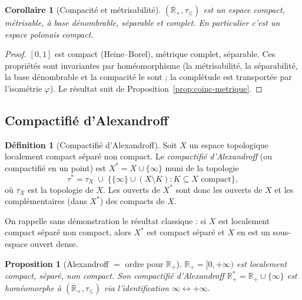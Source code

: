 \documentclass[11pt,a4paper]{article}
\theoremstyle{plain}
\newtheorem{proposition}[theorem]{Proposition}
\newtheorem{corollary}[theorem]{Corollaire}
\theoremstyle{definition}
\newtheorem{definition}[theorem]{Définition}
\newcommand{\Rp}{\mathbb{R}_+}
\newcommand{\Rpb}{\overline{\mathbb{R}}_+}
\begin{document}
\begin{corollary}[Compacité et métrisabilité]\label{cor:compact}
$(\Rpb,\tau_\le)$ est un espace \emph{compact}, \emph{métrisable}, à base
dénombrable, séparable et complet. En particulier c'est un espace
\emph{polonais compact}.
\end{corollary}

\begin{proof}
$[0,1]$ est compact (Heine--Borel), métrique complet, séparable. Ces
propriétés sont invariantes par homéomorphisme (la métrisabilité, la
séparabilité, la base dénombrable et la compacité le sont ; la complétude est
transportée par l'isométrie $\varphi$). Le résultat suit de
Proposition~\ref{prop:coinc-metrique}.
\end{proof}

\subsection{Compactifié d'Alexandroff}

\begin{definition}[Compactifié d'Alexandroff]\label{def:alex}
Soit $X$ un espace topologique localement compact séparé non compact. Le
\emph{compactifié d'Alexandroff} (ou compactifié en un point) est
$X^*=X\cup\{\infty\}$ muni de la topologie
\[
\tau^*=\tau_X\;\cup\;\big\{\{\infty\}\cup(X\setminus K): K\subseteq X\text{ compact}\big\},
\]
où $\tau_X$ est la topologie de $X$. Les ouverts de $X^*$ sont donc les ouverts
de $X$ et les complémentaires (dans $X^*$) des compacts de $X$.
\end{definition}

On rappelle sans démonstration le résultat classique : si $X$ est localement
compact séparé non compact, alors $X^*$ est compact séparé et $X$ en est un
sous-espace ouvert dense.

\begin{proposition}[Alexandroff $=$ ordre pour $\Rp$]\label{prop:alex-ordre}
$\Rp=[0,+\infty)$ est localement compact, séparé, non compact. Son compactifié
d'Alexandroff $\Rp^*=\Rp\cup\{\infty\}$ est homéomorphe à $(\Rpb,\tau_\le)$ via
l'identification $\infty\leftrightarrow+\infty$.
\end{proposition}
\end{document}
